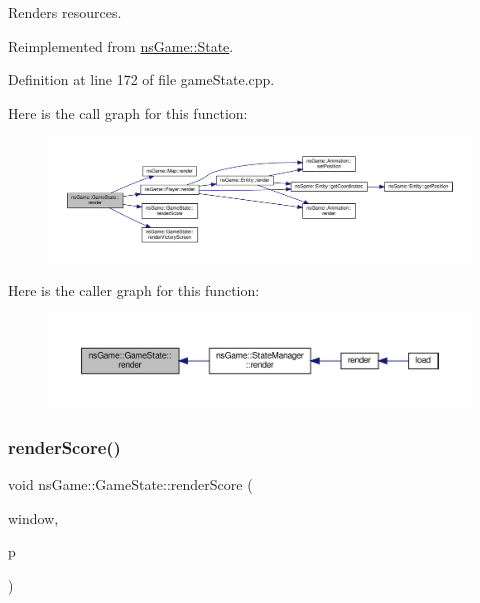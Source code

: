 Renders resources. 



Reimplemented from \hyperlink{structns_game_1_1_state_a214f8ee52de4b318f1ed3861a578ce67}{ns\+Game\+::\+State}.



Definition at line 172 of file game\+State.\+cpp.

Here is the call graph for this function\+:\nopagebreak
\begin{figure}[H]
\begin{center}
\leavevmode
\includegraphics[width=350pt]{classns_game_1_1_game_state_a1e3179b016431332ecff880e09e267d3_cgraph}
\end{center}
\end{figure}
Here is the caller graph for this function\+:\nopagebreak
\begin{figure}[H]
\begin{center}
\leavevmode
\includegraphics[width=350pt]{classns_game_1_1_game_state_a1e3179b016431332ecff880e09e267d3_icgraph}
\end{center}
\end{figure}
\mbox{\label{classns_game_1_1_game_state_a8d9cadd7432dfd4b7ada08e37bf6b30d}} 
\subsubsection{\texorpdfstring{render\+Score()}{renderScore()}}
{\footnotesize\ttfamily void ns\+Game\+::\+Game\+State\+::render\+Score (\begin{DoxyParamCaption}\item[{Min\+GL \&}]{window,  }\item[{\hyperlink{classns_game_1_1_player}{Player}}]{p }\end{DoxyParamCaption})}



